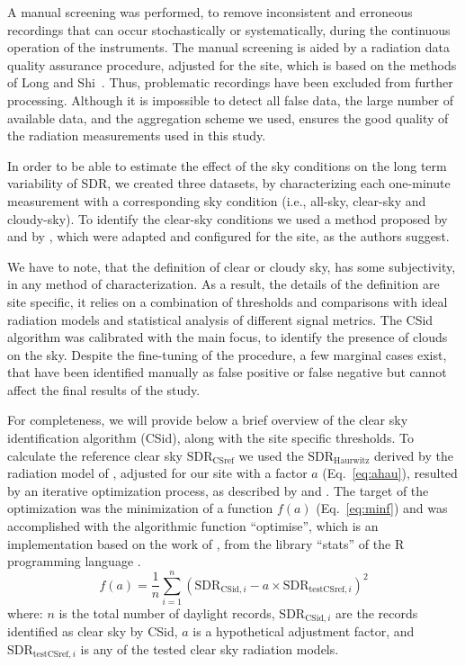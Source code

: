 \documentclass[applsci,article,submit,moreauthors,pdftex]{Definitions/mdpi}
\begin{document}
A manual screening was performed, to remove inconsistent and erroneous
recordings that can occur stochastically or systematically, during the
continuous operation of the instruments. The manual screening is aided
by a radiation data quality assurance procedure, adjusted for the site,
which is based on the methods of Long and
Shi~\citetext{\citeyear{Long2008a}; \citeyear{Long2006}}. Thus,
problematic recordings have been excluded from further processing.
Although it is impossible to detect all false data, the large number of
available data, and the aggregation scheme we used, ensures the good
quality of the radiation measurements used in this study.

In order to be able to estimate the effect of the sky conditions on the
long term variability of SDR, we created three datasets, by
characterizing each one-minute measurement with a corresponding sky
condition (i.e., all-sky, clear-sky and cloudy-sky). To identify the
clear-sky conditions we used a method proposed by \citet{Long2000} and
by \citet{Reno2016}, which were adapted and configured for the site, as
the authors suggest.

We have to note, that the definition of clear or cloudy sky, has some
subjectivity, in any method of characterization. As a result, the
details of the definition are site specific, it relies on a combination
of thresholds and comparisons with ideal radiation models and
statistical analysis of different signal metrics. The CSid algorithm was
calibrated with the main focus, to identify the presence of clouds on
the sky. Despite the fine-tuning of the procedure, a few marginal cases
exist, that have been identified manually as false positive or false
negative but cannot affect the final results of the study.

For completeness, we will provide below a brief overview of the clear
sky identification algorithm (CSid), along with the site specific
thresholds. To calculate the reference clear sky
\(\text{SDR}_\text{CSref}\) we used the \(\text{SDR}_\text{Haurwitz}\)
derived by the radiation model of \citet{Haurwitz1945}, adjusted for our
site with a factor \(a\) (Eq.~\ref{eq:ahau}), resulted by an iterative
optimization process, as described by \citet{Long2000} and
\citet{Reno2016}. The target of the optimization was the minimization of
a function \(f(a)\) (Eq.~\ref{eq:minf}) and was accomplished with the
algorithmic function ``optimise'', which is an implementation based on
the work of \citet{Brent1973}, from the library ``stats'' of the R
programming language \citep{RCT2023}. \begin{equation}
f(a) = \frac{1}{n}\sum_{i=1}^{n} ( \text{SDR}_{\text{CSid},i} - a \times \text{SDR}_{\text{testCSref},i} )^2 \label{eq:minf}
\end{equation} where: \(n\) is the total number of daylight records,
\(\text{SDR}_{\text{CSid},i}\) are the records identified as clear sky
by CSid, \(a\) is a hypothetical adjustment factor, and
\(\text{SDR}_{\text{testCSref},i}\) is any of the tested clear sky
radiation models.
\end{document}
